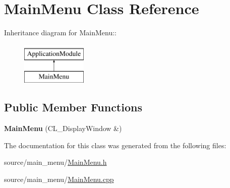 \hypertarget{classMainMenu}{
\section{MainMenu Class Reference}
\label{classMainMenu}
}
Inheritance diagram for MainMenu::\begin{figure}[H]
\begin{center}
\leavevmode
\includegraphics[height=2cm]{classMainMenu}
\end{center}
\end{figure}
\subsection*{Public Member Functions}
\begin{DoxyCompactItemize}
\item 
\hypertarget{classMainMenu_a4f8cb7bce56b9c1053ad0257fa8bec3a}{
{\bfseries MainMenu} (CL\_\-DisplayWindow \&)}
\label{classMainMenu_a4f8cb7bce56b9c1053ad0257fa8bec3a}

\end{DoxyCompactItemize}


The documentation for this class was generated from the following files:\begin{DoxyCompactItemize}
\item 
source/main\_\-menu/\hyperlink{MainMenu_8h}{MainMenu.h}\item 
source/main\_\-menu/\hyperlink{MainMenu_8cpp}{MainMenu.cpp}\end{DoxyCompactItemize}
